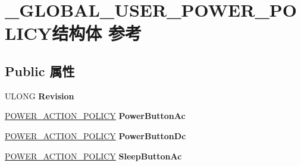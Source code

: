 \hypertarget{struct___g_l_o_b_a_l___u_s_e_r___p_o_w_e_r___p_o_l_i_c_y}{}\section{\+\_\+\+G\+L\+O\+B\+A\+L\+\_\+\+U\+S\+E\+R\+\_\+\+P\+O\+W\+E\+R\+\_\+\+P\+O\+L\+I\+C\+Y结构体 参考}
\label{struct___g_l_o_b_a_l___u_s_e_r___p_o_w_e_r___p_o_l_i_c_y}
\subsection*{Public 属性}
\begin{DoxyCompactItemize}
\item 
\mbox{\label{struct___g_l_o_b_a_l___u_s_e_r___p_o_w_e_r___p_o_l_i_c_y_a544bf0d96f0a6c3b410415c14fa0f800}} 
U\+L\+O\+NG {\bfseries Revision}
\item 
\mbox{\label{struct___g_l_o_b_a_l___u_s_e_r___p_o_w_e_r___p_o_l_i_c_y_a9d80a69a0645543248263652479022f7}} 
\hyperlink{struct___p_o_w_e_r___a_c_t_i_o_n___p_o_l_i_c_y}{P\+O\+W\+E\+R\+\_\+\+A\+C\+T\+I\+O\+N\+\_\+\+P\+O\+L\+I\+CY} {\bfseries Power\+Button\+Ac}
\item 
\mbox{\label{struct___g_l_o_b_a_l___u_s_e_r___p_o_w_e_r___p_o_l_i_c_y_a604b66e5350f737b03e36a128f7c0c4c}} 
\hyperlink{struct___p_o_w_e_r___a_c_t_i_o_n___p_o_l_i_c_y}{P\+O\+W\+E\+R\+\_\+\+A\+C\+T\+I\+O\+N\+\_\+\+P\+O\+L\+I\+CY} {\bfseries Power\+Button\+Dc}
\item 
\mbox{\label{struct___g_l_o_b_a_l___u_s_e_r___p_o_w_e_r___p_o_l_i_c_y_ad4265732262d59c6080143f36c6673fa}} 
\hyperlink{struct___p_o_w_e_r___a_c_t_i_o_n___p_o_l_i_c_y}{P\+O\+W\+E\+R\+\_\+\+A\+C\+T\+I\+O\+N\+\_\+\+P\+O\+L\+I\+CY} {\bfseries Sleep\+Button\+Ac}
\item 
\mbox{\label{struct___g_l_o_b_a_l___u_s_e_r___p_o_w_e_r___p_o_l_i_c_y_a80783eb975a673e77765b9c1fe7e2a03}} 

\end{DoxyCompactItemize}
